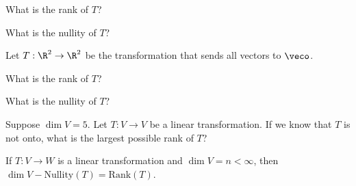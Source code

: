 What is the rank of $T$?  



What is the nullity of $T$?  



\edXsolution{
}

\endedxproblem





Let $T: \R^2 \rightarrow \R^2$ be the transformation that sends all vectors to $\veco$.  


What is the rank of $T$?  



What is the nullity of $T$?  



\edXsolution{
}

\endedxproblem





Suppose $\dim V = 5$.  Let $T: V\rightarrow V$ be a linear transformation.  If we know that $T$ is
not onto, what is the largest possible rank of $T$?  



\edXsolution{
}

\endedxproblem


\endedxvertical






{}  If $T:V\rightarrow W$ is a linear transformation and $\dim V = n < \infty$, then $\dim V - \mathrm{Nullity}(T) = \mathrm{Rank}(T)$.  




